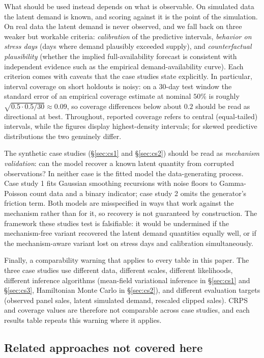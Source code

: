 What should be used instead depends on what is observable. On simulated data the latent demand is known, and scoring against it is the point of the simulation. On real data the latent demand is never observed, and we fall back on three weaker but workable criteria: \emph{calibration} of the predictive intervals, \emph{behavior on stress days} (days where demand plausibly exceeded supply), and \emph{counterfactual plausibility} (whether the implied full-availability forecast is consistent with independent evidence such as the empirical demand-availability curve). Each criterion comes with caveats that the case studies state explicitly. In particular, interval coverage on short holdouts is noisy: on a $30$-day test window the standard error of an empirical coverage estimate at nominal $50\%$ is roughly $\sqrt{0.5 \cdot 0.5 / 30} \approx 0.09$, so coverage differences below about $0.2$ should be read as directional at best. Throughout, reported coverage refers to central (equal-tailed) intervals, while the figures display highest-density intervals; for skewed predictive distributions the two genuinely differ.

The synthetic case studies (\S\ref{sec:cs1} and \S\ref{sec:cs2}) should be read as \emph{mechanism validation}: can the model recover a known latent quantity from corrupted observations? In neither case is the fitted model the data-generating process. Case study 1 fits Gaussian smoothing recursions with noise floors to Gamma-Poisson count data and a binary indicator; case study 2 omits the generator's friction term. Both models are misspecified in ways that work against the mechanism rather than for it, so recovery is not guaranteed by construction. The framework these studies test is falsifiable: it would be undermined if the mechanism-free variant recovered the latent demand quantities equally well, or if the mechanism-aware variant lost on stress days and calibration simultaneously.

Finally, a comparability warning that applies to every table in this paper. The three case studies use different data, different scales, different likelihoods, different inference algorithms (mean-field variational inference in \S\ref{sec:cs1} and \S\ref{sec:cs3}, Hamiltonian Monte Carlo in \S\ref{sec:cs2}), and different evaluation targets (observed panel sales, latent simulated demand, rescaled clipped sales). CRPS and coverage values are therefore not comparable across case studies, and each results table repeats this warning where it applies.

\subsection{Related approaches not covered here}\label{sec:related}

